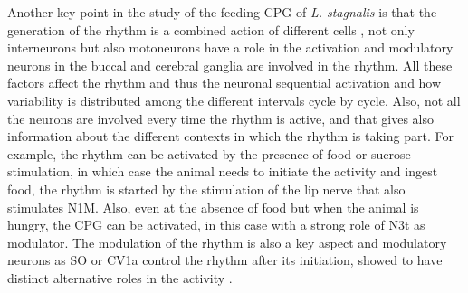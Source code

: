 Another key point in the study of the feeding CPG of \textit{L. stagnalis} is that the generation of the rhythm is a combined action of different cells \cite{benjamin_distributed_2012}, not only interneurons but also motoneurons have a role in the activation \parencite{staras_pattern-generating_1998} and modulatory neurons in the buccal and cerebral ganglia are involved in the rhythm. All these factors affect the rhythm and thus the neuronal sequential activation and how variability is distributed among the different intervals cycle by cycle. Also, not all the neurons are involved every time the rhythm is active, and that gives also information about the different contexts in which the rhythm is taking part. For example, the rhythm can be activated by the presence of food or sucrose stimulation, in which case the animal needs to initiate the activity and ingest food, the rhythm is started by the stimulation of the lip nerve that also stimulates N1M. Also, even at the absence of food but when the animal is hungry, the CPG can be activated, in this case with a strong role of N3t as modulator. The modulation of the rhythm is also a key aspect and modulatory neurons as SO or CV1a control the rhythm after its initiation, showed to have distinct alternative roles in the activity \parencite{kemenes_multiple_2001}. 

